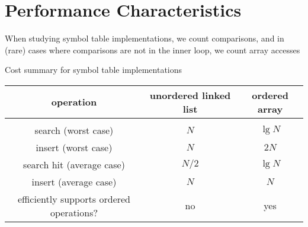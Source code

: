 \documentclass[8pt,a4paper,compress]{beamer}
\begin{document}
\section{Performance Characteristics}
\begin{frame}[fragile]
\pause

When studying symbol table implementations, we count comparisons, and in (rare) cases where comparisons are not in the inner loop, we count array accesses

\pause
\bigskip

Cost summary for symbol table implementations
\begin{center}
\begin{tabular}{ccc}
operation & unordered linked list & ordered array \\ \hline \\
search (worst case) & $N$ & $\lg N$ \\
insert (worst case) & $N$ & $2N$ \\
search hit (average case) & $N/2$ & $\lg N$ \\
insert (average case) & $N$ & $N$ \\
efficiently supports ordered operations? & no & yes
\end{tabular} 
\end{center}
\end{frame}
\end{document}
